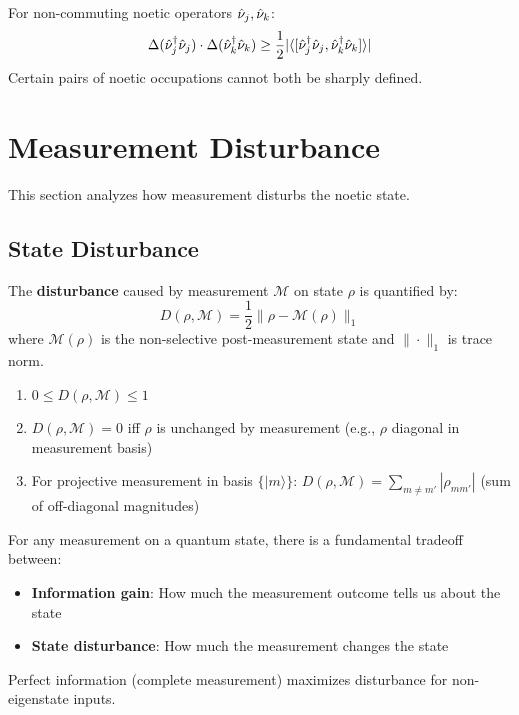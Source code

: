 \begin{corollary}
\label{cor:noetic-uncertainty}
For non-commuting noetic operators $\hat{\nu}_j, \hat{\nu}_k$:
\[
\Delta(\hat{\nu}_j^\dagger \hat{\nu}_j) \cdot \Delta(\hat{\nu}_k^\dagger \hat{\nu}_k) \geq \frac{1}{2} |\langle [\hat{\nu}_j^\dagger \hat{\nu}_j, \hat{\nu}_k^\dagger \hat{\nu}_k] \rangle|
\]
Certain pairs of noetic occupations cannot both be sharply defined.
\end{corollary}

\section{Measurement Disturbance}
\label{sec:measurement-disturbance}

This section analyzes how measurement disturbs the noetic state.

\subsection{State Disturbance}

\begin{definition}
\label{def:disturbance}
The \textbf{disturbance} caused by measurement $\mathcal{M}$ on state $\rho$ is quantified by:
\[
D(\rho, \mathcal{M}) = \frac{1}{2}\|\rho - \mathcal{M}(\rho)\|_1
\]
where $\mathcal{M}(\rho)$ is the non-selective post-measurement state and $\|\cdot\|_1$ is trace norm.
\end{definition}

\begin{proposition}
\label{prop:disturbance-bounds}
\begin{enumerate}
  \item $0 \leq D(\rho, \mathcal{M}) \leq 1$
  \item $D(\rho, \mathcal{M}) = 0$ iff $\rho$ is unchanged by measurement (e.g., $\rho$ diagonal in measurement basis)
  \item For projective measurement in basis $\{|m\rangle\}$: $D(\rho, \mathcal{M}) = \sum_{m \neq m'} |\rho_{mm'}|$ (sum of off-diagonal magnitudes)
\end{enumerate}
\end{proposition}

\begin{theorem}
\label{thm:info-disturbance}
For any measurement on a quantum state, there is a fundamental tradeoff between:
\begin{itemize}
  \item \textbf{Information gain}: How much the measurement outcome tells us about the state
  \item \textbf{State disturbance}: How much the measurement changes the state
\end{itemize}
Perfect information (complete measurement) maximizes disturbance for non-eigenstate inputs.
\end{theorem}

